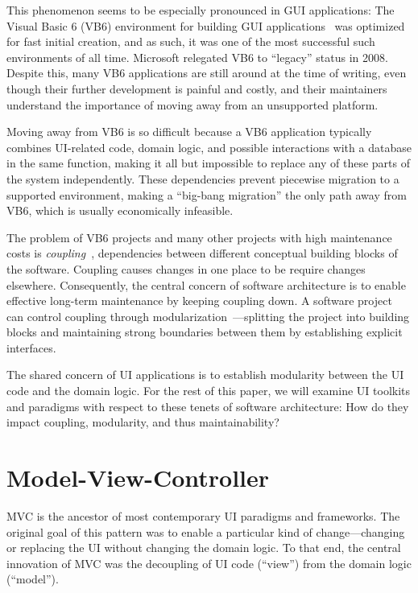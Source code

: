 \documentclass[sigplan,screen]{acmart}
\begin{document}
This phenomenon seems to be especially pronounced in GUI applications:
The Visual Basic 6 (VB6) environment for building GUI
applications~\cite{VB6} was optimized for fast initial creation, and
as such, it was one of the most successful such environments of all time.
Microsoft relegated VB6 to ``legacy'' status in 2008. Despite this,
many VB6 applications are still around at the time of writing, even
though their further development is painful and costly, and their
maintainers understand the importance of moving away from an
unsupported platform.

Moving away from VB6 is so difficult because a VB6 application
typically combines UI-related code, domain logic, and possible
interactions with a database in the same function, making it
all but impossible to replace any of these parts of the system
independently.  These dependencies prevent piecewise migration to a
supported environment, making a ``big-bang migration'' the only
path away from VB6, which is usually economically
infeasible.

The problem of VB6 projects and many other projects with
high maintenance costs is \textit{coupling}~\cite{GreenBook},
dependencies between different conceptual building blocks of the
software. Coupling causes changes in one place to be require changes 
elsewhere.  Consequently, the central concern of software
architecture is to enable effective long-term maintenance by keeping
coupling down.  A software project can control coupling through 
{modularization}~\cite{Modularity}---splitting the
project into building blocks and maintaining strong boundaries between
them by establishing explicit interfaces.

The shared concern of UI applications is to establish modularity
between the UI code and the domain logic.  For the rest of this paper, we will examine UI toolkits and paradigms
with respect to these tenets of software architecture: How do they
impact coupling, modularity, and thus maintainability?  


\section{Model-View-Controller}
\label{sec:mvc}
  

MVC is the ancestor of most contemporary UI paradigms and frameworks.
The original goal of this pattern was to enable a particular kind of
change---changing or replacing the UI without changing the domain
logic.  To that end, the central innovation of MVC was the decoupling
of UI code (``view'') from the domain logic (``model'').
\end{document}
